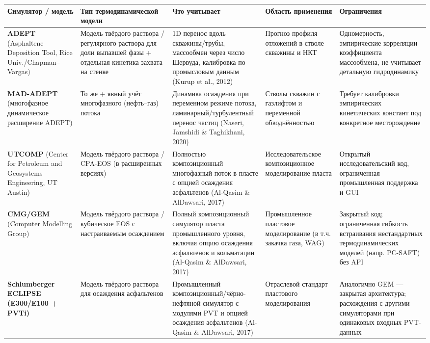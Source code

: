 \documentclass[11pt]{extarticle}
\begin{document}
{\def\LTcaptype{none} %
\begin{xltabular}{\linewidth}{@{}
  >{\raggedright\arraybackslash}X
  >{\raggedright\arraybackslash}X
  >{\raggedright\arraybackslash}X
  >{\raggedright\arraybackslash}X
  >{\raggedright\arraybackslash}X@{}}
\toprule\noalign{}
Симулятор / модель & Тип термодинамической модели & Что учитывает & Область применения & Ограничения \\
\midrule\noalign{}
\endhead
\bottomrule\noalign{}
\endlastfoot
\textbf{ADEPT} (Asphaltene Deposition Tool, Rice Univ./Chapman--Vargas) & Модель твёрдого раствора / регулярного раствора для доли выпавшей фазы + отдельная кинетика захвата на стенке & 1D перенос вдоль скважины/трубы, массообмен через число Шервуда, калибровка по промысловым данным (Kurup et al., 2012) & Прогноз профиля отложений в стволе скважины и НКТ & Одномерность, эмпирические корреляции коэффициента массообмена, не учитывает детальную гидродинамику \\
\textbf{MAD-ADEPT} (многофазное динамическое расширение ADEPT) & То же + явный учёт многофазного (нефть--газ) потока & Динамика осаждения при переменном режиме потока, ламинарный/турбулентный перенос частиц (Naseri, Jamshidi \& Taghikhani, 2020) & Стволы скважин с газлифтом и переменной обводнённостью & Требует калибровки эмпирических кинетических констант под конкретное месторождение \\
\textbf{UTCOMP} (Center for Petroleum and Geosystems Engineering, UT Austin) & Модель твёрдого раствора / CPA-EOS (в расширенных версиях) & Полностью композиционный многофазный поток в пласте с опцией осаждения асфальтенов (Al-Qasim \& AlDawsari, 2017) & Исследовательское композиционное моделирование пласта & Открытый исследовательский код, ограниченная промышленная поддержка и GUI \\
\textbf{CMG/GEM} (Computer Modelling Group) & Модель твёрдого раствора / кубическое EOS с настраиваемым осаждением & Полный композиционный симулятор пласта промышленного уровня, включая опцию осаждения асфальтенов и кольматации (Al-Qasim \& AlDawsari, 2017) & Промышленное пластовое моделирование (в т.ч. закачка газа, WAG) & Закрытый код; ограниченная гибкость встраивания нестандартных термодинамических моделей (напр. PC-SAFT) без API \\
\textbf{Schlumberger ECLIPSE (E300/E100 + PVTi)} & Модель твёрдого раствора для осаждения асфальтенов & Промышленный композиционный/чёрно-нефтяной симулятор с модулями PVT и опцией осаждения асфальтенов (Al-Qasim \& AlDawsari, 2017) & Отраслевой стандарт пластового моделирования & Аналогично GEM --- закрытая архитектура; расхождения с другими симуляторами при одинаковых входных PVT-данных \\

\end{xltabular}}
\end{document}
